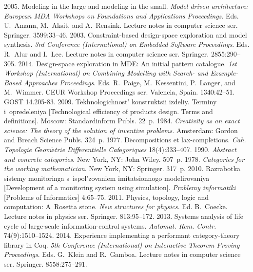 \begin{multicols}{2}
{{\begin{thebibliography}{99}
 2005. Modeling 
in the large and modeling in the small. \textit{Model driven architecture: European MDA 
Workshops on Foundations and Applications Proceedings}. Eds. U.~\mbox{A{\!\ptb{\ss}}mann}, M.~Aksit,
and A.~Rensink. Lecture notes in computer science ser. Springer. 3599:33--46.
 2003. Constraint-based design-space 
exploration and model synthesis. \textit{3rd Conference (International) on Embedded Software 
Proceedings}. Eds. R.~Alur and I.~Lee. Lecture notes in computer science ser. Springer.  
2855:290--305.
 2014. Design-space 
exploration in MDE: An initial pattern catalogue. \textit{1st Workshop (International) on 
Combining Modelling with Search- and Example-Based Approaches Proceedings}. Eds. R.~Paige, 
M.~Kessentini, P.~Langer, and M.~Wimmer. CEUR Workshop Proceedings ser. Valencia, Spain. 
1340:42--51.
GOST 14.205-83. 2009. Tekhnologichnost' konstruktsii izdeliy. Terminy i~opredeleniya 
[Technological efficiency of products design. Terms and definitions]. Moscow: Standardinform 
Publs. 22~p.
 1984. \textit{Creativity as an exact science: The theory of the solution of 
inventive problems}. Amsterdam: Gordon and Breach Science Publs. 324~p.
 1977. D$\acute{\mbox{e}}$compositions et 
lax-compl$\acute{\mbox{e}}$tions. \textit{Cah. Topologie 
G$\acute{\mbox{e}}$om$\acute{\mbox{e}}$trie Diff$\acute{\mbox{e}}$rentielle 
Cat$\acute{\mbox{e}}$goriques} 18(4):333--407.
 1990. \textit{Abstract and 
concrete categories}. New York, NY: John Wiley. 507~p.
 1978. \textit{Categories for the working mathematician}. New York, NY: 
Springer. 317~p.
 2010. Razrabotka sistemy monitoringa 
s~ispol'zovaniem imitatsionnogo modelirovaniya [Development of a monitoring system using 
simulation]. \textit{Problemy informatiki} [Problems of Informatics] 4:65--75.
 2011. Physics, topology, logic and computation: A~Rosetta stone. 
\textit{New structures for physics}. Ed. B.~Coecke. Lecture notes in physics ser. Springer. 
 813:95--172.
 2013. Systems analysis of life cycle of large-scale information-control 
systems. \textit{Automat. Rem. Contr.} 74(9):1510--1524.
 2014. Experience implementing a performant 
category-theory library in Coq. \textit{5th Conference (International) on Interactive Theorem 
Proving Proceedings}. Eds. G.~Klein and R.~Gamboa. Lecture notes in computer science ser. 
Springer. 8558:275--291.
\end{thebibliography}

}}
\end{multicols}
